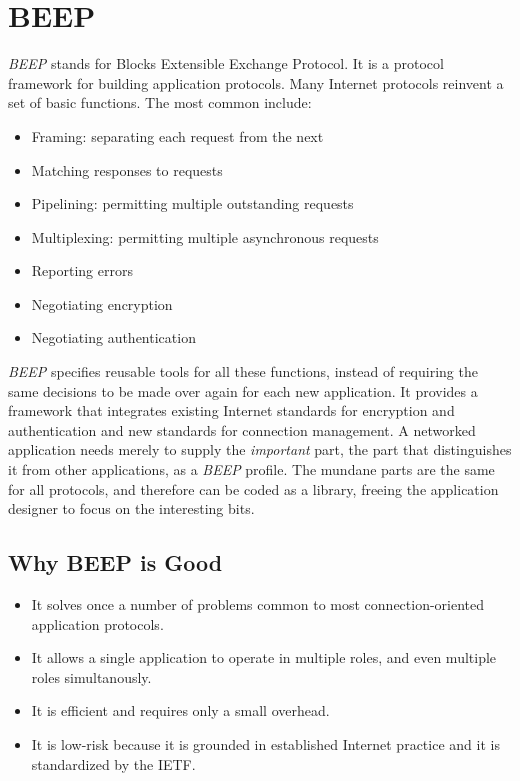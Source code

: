 \section{BEEP}
\emph{BEEP} stands for Blocks Extensible Exchange Protocol. It is a protocol framework for building application protocols. Many Internet protocols reinvent a set of basic functions. The most common include:

\begin{itemize}
 \item Framing: separating each request from the next
 \item Matching responses to requests
 \item Pipelining: permitting multiple outstanding requests
 \item Multiplexing: permitting multiple asynchronous requests
 \item Reporting errors
 \item Negotiating encryption
 \item Negotiating authentication
\end{itemize}

\emph{BEEP} specifies reusable tools for all these functions, instead of requiring the same decisions to be made over again for each new application. It provides a framework that integrates existing Internet standards for encryption and authentication and new standards for connection management. A networked application needs merely to supply the \emph{important} part, the part that distinguishes it from other applications, as a \emph{BEEP} profile. The mundane parts are the same for all protocols, and therefore can be coded as a library, freeing the application designer to focus on the interesting bits.

\subsection{Why BEEP is Good}
\begin{itemize}
 \item It solves once a number of problems common to most connection-oriented application protocols.
 \item It allows a single application to operate in multiple roles, and even multiple roles simultanously.
 \item It is efficient and requires only a small overhead.
 \item It is low-risk because it is grounded in established Internet practice and it is standardized by the IETF.
\end{itemize}


